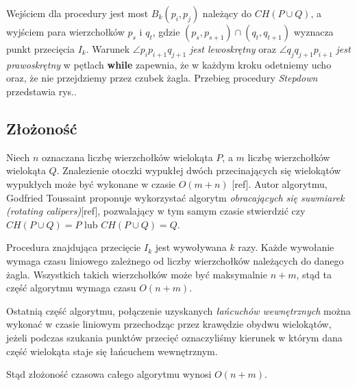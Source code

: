 Wejściem dla procedury jest most $B_k(p_i,p_j)$ należący do $CH(P \cup
Q)$, a wyjściem para wierzchołków $p_s$ i $q_t$, gdzie $(p_s,p_{s+1})
\cap (q_t,q_{t+1})$ wyznacza punkt przecięcia $I_k$. Warunek $\angle
p_{i}p_{i+1}q_{j+1}$ \emph{jest lewoskrętny} oraz $\angle
q_{j}q_{j+1}p_{i+1}$ \emph{jest prawoskrętny} w pętlach \textbf{while}
zapewnia, że w każdym kroku odetniemy ucho oraz, że nie przejdziemy
przez czubek żagla. Przebieg procedury \emph{Stepdown} przedstawia
rys..

\subsection{Złożoność}
Niech $n$ oznaczana liczbę wierzchołków wielokąta $P$, a $m$ liczbę
wierzchołków wielokąta $Q$. Znalezienie otoczki wypukłej dwóch
przecinających się wielokątów wypukłych może być wykonane w czasie
$O(m + n)$ [ref]. Autor algorytmu, Godfried Toussaint proponuje
wykorzystać algorytm \emph{obracających się suwmiarek (rotating
  calipers)}[ref], pozwalający w tym samym czasie stwierdzić czy $CH(P
\cup Q) = P$ lub $CH(P \cup Q) = Q$.

Procedura znajdująca przecięcie $I_k$ jest wywoływana $k$ razy. Każde
wywołanie wymaga czasu liniowego zależnego od liczby wierzchołków
należących do danego żagla. Wszystkich takich wierzchołków może być
maksymalnie $n + m$, stąd ta część algorytmu wymaga czasu $O(n + m)$.

Ostatnią część algorytmu, połączenie uzyskanych \emph{łańcuchów
  wewnętrznych} można wykonać w czasie liniowym przechodząc przez
krawędzie obydwu wielokątów, jeżeli podczas szukania punktów przecięć
oznaczyliśmy kierunek w którym dana część wielokąta staje się
łańcuchem wewnętrznym.

Stąd złożoność czasowa całego algorytmu wynosi $O(n + m)$.

